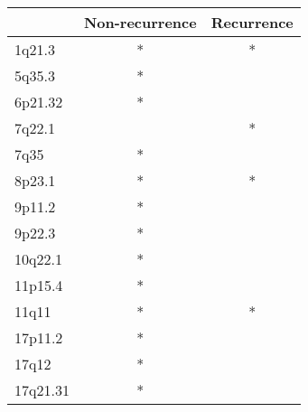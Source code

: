 \begin{tabular}{lcc}
\toprule
{} & Non-recurrence & Recurrence \\
\midrule
1q21.3   &              * &          * \\
5q35.3   &              * &            \\
6p21.32  &              * &            \\
7q22.1   &                &          * \\
7q35     &              * &            \\
8p23.1   &              * &          * \\
9p11.2   &              * &            \\
9p22.3   &              * &            \\
10q22.1  &              * &            \\
11p15.4  &              * &            \\
11q11    &              * &          * \\
17p11.2  &              * &            \\
17q12    &              * &            \\
17q21.31 &              * &            \\
\bottomrule
\end{tabular}
